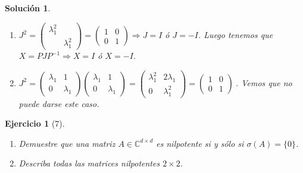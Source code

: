 \documentclass[11pt, a4paper]{article}
\newif\IfInSansMode
\numberwithin{equation}{section}
\theoremstyle{theorem-style}
\theoremstyle{definition-style}
\newtheorem{ejer}{Ejercicio}[section]
\theoremstyle{remark-style}
\newtheorem*{sol}{Solución}
\theoremstyle{example-style}
\newenvironment{nlist}
{\begin{enumerate}
    \renewcommand\labelenumi{(\emph{\roman{enumi})}}}
{\end{enumerate}}
\begin{document}
\begin{sol}
\begin{nlist}
        \item $J^2 =
            \begin{pmatrix}
                \lambda_1^2 & \\
                            & \lambda_1^2
            \end{pmatrix} =  \begin{pmatrix}
                1 & 0 \\
                0 & 1
            \end{pmatrix} \Rightarrow J = I$ ó $J = -I$. Luego tenemos que $X = PJP^{-1} \Rightarrow X= I$ ó
            $X = -I$.
        \item $J^2 =
            \begin{pmatrix}
                \lambda_1 & 1 \\
                0 & \lambda_1
            \end{pmatrix}
            \begin{pmatrix}
                \lambda_1 & 1 \\
                0 & \lambda_1
            \end{pmatrix} =
            \begin{pmatrix}
                \lambda_1^2 & 2\lambda_1 \\
                0 & \lambda_1^2
            \end{pmatrix} = \begin{pmatrix}
                1 & 0 \\
                0 & 1
            \end{pmatrix} \ $.
            Vemos que no puede darse este caso.
        \end{nlist}
    \end{sol}

    \begin{ejer}[7] \hfill
        \begin{nlist}
        \item Demuestre que una matriz $A \in \mathbb C^{d\times d}$ es nilpotente si
            y sólo si $\sigma(A) = \{0\}$.
        \item Describa todas las matrices nilpotentes $2 \times 2$.
        \end{nlist}
    \end{ejer}
\end{document}
